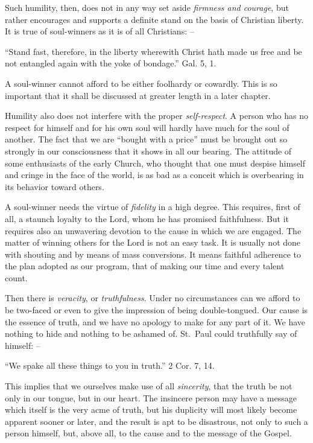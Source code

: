 \documentclass[
]{book}
\begin{document}
Such humility, then, does not in any way set aside \emph{firmness and courage}, but rather encourages and supports a definite stand on the basis of Christian liberty. It is true of soul-winners as it is of all Christians: --

``Stand fast, therefore, in the liberty wherewith Christ hath made us free and be not entangled again with the yoke of bondage.'' Gal. 5, 1.

A soul-winner cannot afford to be either foolhardy or cowardly. This is so important that it shall be discussed at greater length in a later chapter.

Humility also does not interfere with the proper \emph{self-respect}. A person who has no respect for himself and for his own soul will hardly have much for the soul of another. The fact that we are ``bought with a price'' must be brought out so strongly in our consciousness that it shows in all our bearing. The attitude of some enthusiasts of the early Church, who thought that one must despise himself and cringe in the face of the world, is as bad as a conceit which is overbearing in its behavior toward others.

A soul-winner needs the virtue of \emph{fidelity} in a high degree. This requires, first of all, a staunch loyalty to the Lord, whom he has promised faithfulness. But it requires also an unwavering devotion to the cause in which we are engaged. The matter of winning others for the Lord is not an easy task. It is usually not done with shouting and by means of mass conversions. It means faithful adherence to the plan adopted as our program, that of making our time and every talent count.

Then there is \emph{veracity}, or \emph{truthfulness}. Under no circumstances can we afford to be two-faced or even to give the impression of being double-tongued. Our cause is the essence of truth, and we have no apology to make for any part of it. We have nothing to hide and nothing to be ashamed of. St.~Paul could truthfully say of himself: --

``We spake all these things to you in truth.'' 2 Cor. 7, 14.

This implies that we ourselves make use of all \emph{sincerity}, that the truth be not only in our tongue, but in our heart. The insincere person may have a message which itself is the very acme of truth, but his duplicity will most likely become apparent sooner or later, and the result is apt to be disastrous, not only to such a person himself, but, above all, to the cause and to the message of the Gospel.
\end{document}
